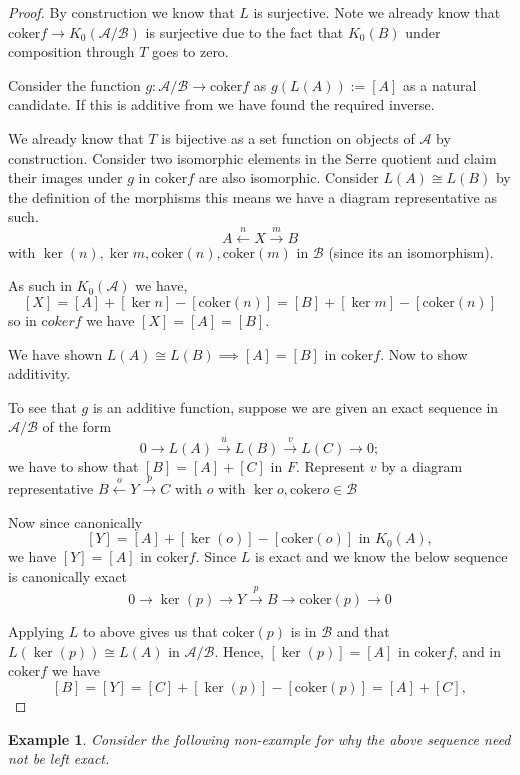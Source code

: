 \documentclass[12pt]{article}
\numberwithin{equation}{section}
\newcommand{\coker}{{\mathrm{coker}}}
\newcounter{dummy} \numberwithin{dummy}{section}
\newtheorem{example}[dummy]{Example}
\begin{document}
	\begin{proof}
		By construction we know that $L$ is surjective.
		Note we already know that $\mathrm{coker} f \to  K_0(\mathcal{A/B})$ is surjective due to the fact that $K_0(B) $ under composition through $T$ goes to zero.
		
		Consider the function $g:\mathcal{A/B} \to \mathrm{coker}f$ as $g(L(A)):=[A]$ as a natural candidate. If this is additive from we have found the required inverse.
		
		We already know that $T $ is bijective as a set function on objects of $\mathcal{A}$ by construction. Consider two isomorphic elements in the Serre quotient and claim their images under $g$ in $\mathrm{coker} f $ are also isomorphic. Consider $L(A) \cong L(B)$ by the definition of the morphisms this means we have a diagram representative as such.
		\[ A \xleftarrow{n} X \xrightarrow{m} B \] with $\ker(n), \ker{m}, \mathrm{coker} (n) , \mathrm{coker}(m)$ in $\mathcal{B}$ (since its an isomorphism).
		
			As such in $K_0(\mathcal{A})$ we have, $$[X]=[A]+[\ker n]-[\mathrm{coker}(n)]=[B]+[\ker m]- [\mathrm{coker}(n)]$$ so in $\mathrm coker f$ we have $[X] = [A]=[B]$.
			
		We have shown $L(A) \cong L(B) \implies [A]=[B]$ in $\mathrm{coker} f$. Now to show additivity.
		
		To see that \( g \) is an additive function, suppose we are given an exact sequence in \( \mathcal{A/B} \) of the form
		\[
		0 \rightarrow L(A) \xrightarrow{u	} L(B) \xrightarrow{v} L(C) \rightarrow 0;
		\]
		we have to show that \( [B] = [A] + [C] \) in \( F \). Represent \( v \) by a diagram representative \( B \xleftarrow{o} Y \xrightarrow{p}	 C \) with \( o \) with $\ker o , \coker o \in \mathcal{B}$
		
		Now since canonically
		\[
		[Y] = [A] + [\ker(o)] - [\coker(o)] \text{ in } K_0(A),
		\]
		we have \( [Y] = [A] \) in \( \coker f \). Since \( L \) is exact and we know the below sequence is canonically exact
		\[
		0 \rightarrow \ker(p) \rightarrow Y \xrightarrow{p} B \rightarrow \coker(p) \rightarrow 0	\]
	
		Applying $L $ to above gives us that \( \coker(p) \) is in \( \mathcal B \) and that \( L(\ker(p)) \cong L(A) \) in \( \mathcal{A/B} \). Hence, \( [\ker(p)] = [A] \) in \( \coker f \), and in \( \coker f \) we have
		\[
		[B] = [Y] = [C] + [\ker(p)] - [\coker(p)] = [A] + [C],
		\]
	\end{proof}
	\begin{example}
		Consider the following non-example for why the above sequence need not be left exact.
	\end{example}
\end{document}

